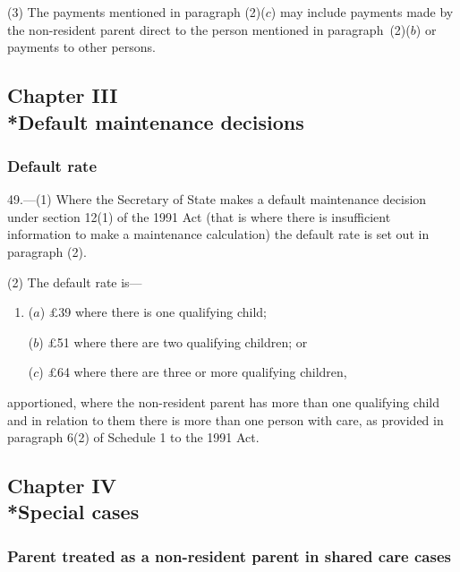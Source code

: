 \documentclass[12pt,a4paper]{article}
\begin{document}
(3) The payments mentioned in paragraph (2)($c$)  may include payments made by the non-resident parent direct to the person mentioned in paragraph~(2)($b$)  or payments to other persons.

\subsection[Chapter III --- Default maintenance decisions]{Chapter III\\*Default maintenance decisions}

\renewcommand\parthead{--- Part IV Chapter III}

\subsubsection[49. Default rate]{Default rate}

49.---(1)  Where the Secretary of State makes a default maintenance decision under section 12(1) of the 1991 Act (that is where there is insufficient information to make a maintenance calculation) the default rate is set out in paragraph (2).

(2) The default rate is—
\begin{enumerate}\item[]
($a$) £39 where there is one qualifying child;

($b$) £51 where there are two qualifying children; or

($c$) £64 where there are three or more qualifying children,
\end{enumerate}
apportioned, where the non-resident parent has more than one qualifying child and in relation to them there is more than one person with care, as provided in paragraph 6(2) of Schedule 1 to the 1991 Act.

\subsection[Chapter IV --- Special cases]{Chapter IV\\*Special cases}

\renewcommand\parthead{--- Part IV Chapter IV}

\subsubsection[50. Parent treated as a non-resident parent in shared care cases]{Parent treated as a non-resident parent in shared care cases}
\end{document}
